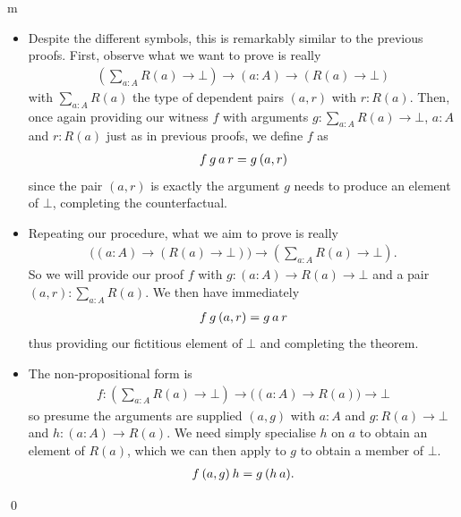\documentclass[11pt]{article}
\begin{document}
\begin{my proof}{m}
\begin{itemize}
\item Despite the different symbols, this is remarkably similar to the previous proofs. First, observe what we want to prove is really \begin{gather*}
\left( \sum_{a : A} R(a) \to \bot \right) \to (a : A) \to (R(a) \to \bot)
\end{gather*}
with $\sum_{a : A} R(a)$ the type of dependent pairs $(a,r)$ with $r \colon R(a)$. Then, once again providing our witness $f$ with arguments $g \colon \sum_{a : A} R(a) \to \bot$, $a \colon A$ and $r \colon R(a)$ just as in previous proofs, we define $f$ as \begin{gather*}
f \hspace{0.2em} g \hspace{0.2em} a \hspace{0.2em} r = g \hspace{0.2em} (a,r)
\end{gather*}
since the pair $(a,r)$ is exactly the argument $g$ needs to produce an element of $\bot$, completing the counterfactual.


\item Repeating our procedure, what we aim to prove is really \begin{gather*}
\big( (a \colon A) \to ( R(a) \to \bot) \big) \to \left( \sum_{a : A} R(a) \to \bot \right).
\end{gather*}
So we will provide our proof $f$ with $g \colon (a \colon A) \to R(a) \to \bot$ and a pair $(a,r) \colon \sum_{a : A} R(a)$. We then have immediately \begin{gather*}
f \hspace{0.2em} g \hspace{0.2em} (a,r) = g \hspace{0.2em} a \hspace{0.2em} r
\end{gather*}
thus providing our fictitious element of $\bot$ and completing the theorem.

\item The non-propositional form is \begin{gather*}
f\colon \left( \sum_{a : A} R(a) \to \bot \right) \to \big((a : A) \to R(a) \big) \to \bot
\end{gather*}
so presume the arguments are supplied $(a , g)$ with $a \colon A$ and $g \colon R(a) \to \bot$ and $h \colon (a : A) \to R(a)$. We need simply specialise $h$ on $a$ to obtain an element of $R(a)$, which we can then apply to $g$ to obtain a member of $\bot$. \begin{gather*}
f \hspace{0.2em} (a,g) \hspace{0.2em} h =  g \hspace{0.2em} (h \hspace{0.2em} a).
\end{gather*}
\end{itemize}
\qed
\end{my proof}
\end{document}
